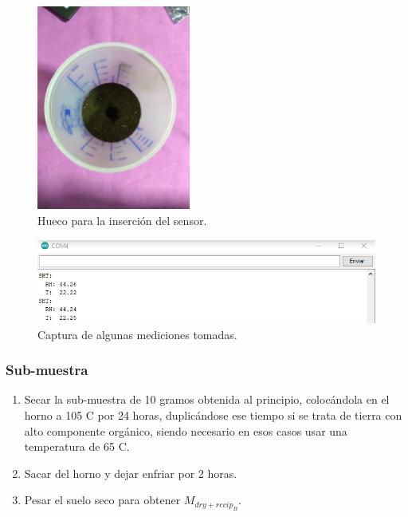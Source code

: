 \begin{figure}[H]
    \centering
    \includegraphics[width=0.45\textwidth]{imagenes/imagenes calibracion/hueco.jpg}
    \caption{Hueco para la inserción del sensor.}
    \label{fig:hueco}
\end{figure}

\begin{figure}[H]
    \centering
    \includegraphics[width=\textwidth]{imagenes/imagenes calibracion/medidas.PNG}
    \caption{Captura de algunas mediciones tomadas.}
    \label{fig:mediciones}
\end{figure}

\subsubsection{Sub-muestra}

\begin{enumerate}

    \item Secar la sub-muestra de 10 gramos obtenida al principio, colocándola en el horno a 105 \degree C por 24 horas, duplicándose ese tiempo si se trata de tierra con alto componente orgánico, siendo necesario en esos casos usar una temperatura de 65 \degree C.
    \item Sacar del horno y dejar enfriar por 2 horas.
    \item Pesar el suelo seco para obtener $M_{dry+recip_B}$.
    

    
\end{enumerate}

